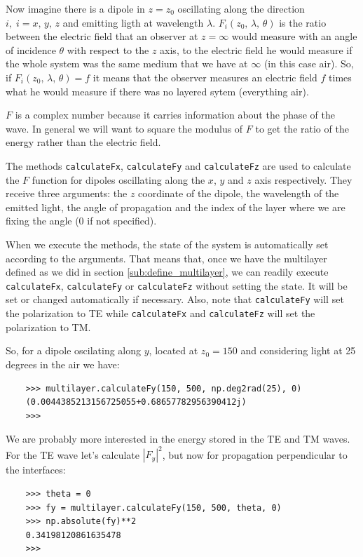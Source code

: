 \documentclass[a4paper,11pt,aps,final]{revtex4}
\begin{document}
Now imagine there is a dipole in $z = z_0$ oscillating along the direction $i,\;i=x,\,y,\,z$ and emitting ligth at wavelength $\lambda$. $F_i(z_0,\, \lambda,\, \theta)$ is the ratio between the electric field that an observer at $z = \infty$ would measure with an angle of incidence $\theta$ with respect to the $z$ axis, to the electric field he would measure if the whole system was the same medium that we have at $\infty$ (in this case air). So, if $F_i(z_0,\, \lambda,\, \theta) = f$ it means that the observer measures an electric field $f$ times what he would measure if there was no layered sytem (everything air).

$F$ is a complex number because it carries information about the phase of the wave. In general we will want to square the modulus of $F$ to get the ratio of the energy rather than the electric field.

The methods \texttt{calculateFx}, \texttt{calculateFy} and \texttt{calculateFz} are used to calculate the $F$ function for dipoles oscillating along the $x$, $y$ and $z$ axis respectively. They receive three arguments: the $z$ coordinate of the dipole, the wavelength of the emitted light, the angle of propagation and the index of the layer where we are fixing the angle (0 if not specified).

When we execute the methods, the state of the system is automatically set according to the arguments. That means that, once we have the multilayer defined as we did in section \ref{sub:define_multilayer}, we can readily execute \texttt{calculateFx}, \texttt{calculateFy} or \texttt{calculateFz} without setting the state. It will be set or changed automatically if necessary. Also, note that \texttt{calculateFy} will set the polarization to TE while \texttt{calculateFx} and \texttt{calculateFz} will set the polarization to TM.

So, for a dipole oscilating along $y$, located at $z_0 = 150$ and considering light at 25 degrees in the air we have:
\begin{verbatim}
    >>> multilayer.calculateFy(150, 500, np.deg2rad(25), 0)
    (0.0044385213156725055+0.68657782956390412j)
    >>>
\end{verbatim}

We are probably more interested in the energy stored in the TE and TM waves. For the TE wave let's calculate $|F_y|^2$, but now for propagation perpendicular to the interfaces:
\begin{verbatim}
    >>> theta = 0
    >>> fy = multilayer.calculateFy(150, 500, theta, 0)
    >>> np.absolute(fy)**2
    0.34198120861635478
    >>>
\end{verbatim}
\end{document}
